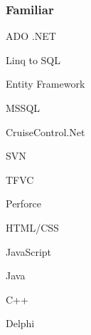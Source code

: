 \documentclass[a4paper,11pt]{article}
\begin{document}
\begin{minipage}[t]{0.34\textwidth}
    \subsubsection*{Familiar}
    \begin{inparaitem}
      \item ADO .NET 
      \item Linq to SQL
      \item Entity Framework
      \item MSSQL
      \item CruiseControl.Net
      \item SVN
      \item TFVC
      \item Perforce
      \item HTML/CSS
      \item JavaScript
      \item Java
      \item C++
      \item Delphi
    \end{inparaitem}
  \end{minipage}
  \hfill
\end{document}
